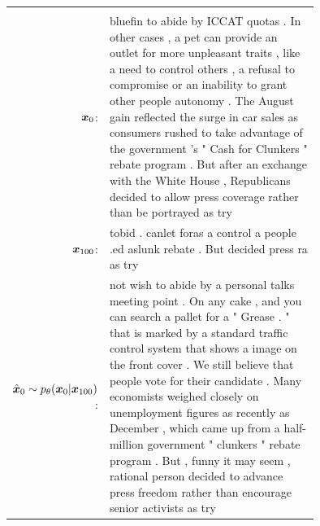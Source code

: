 {\begin{tabular}{rp{0.75\linewidth}}
\hline\\
$\boldsymbol{x}_0$: &\strut{}bluefin to abide by ICCAT quotas . In other cases , a pet can provide an outlet for more unpleasant traits , like a need to control others , a refusal to compromise or an inability to grant other people autonomy . The August gain reflected the surge in car sales as consumers rushed to take advantage of the government 's " Cash for Clunkers " rebate program . But after an exchange with the White House , Republicans decided to allow press coverage rather than be portrayed as try\\
$\boldsymbol{x}_{100}$: &\strut{}\smallmasktok{}\smallmasktok{} to\smallmasktok{}bid\smallmasktok{}\smallmasktok{}\smallmasktok{}\smallmasktok{}\smallmasktok{}\smallmasktok{}\smallmasktok{} .\smallmasktok{}\smallmasktok{}\smallmasktok{}\smallmasktok{}\smallmasktok{}\smallmasktok{}\smallmasktok{}\smallmasktok{} can\smallmasktok{}\smallmasktok{}\smallmasktok{}let for\smallmasktok{}\smallmasktok{}\smallmasktok{}\smallmasktok{}as\smallmasktok{}\smallmasktok{}\smallmasktok{}\smallmasktok{}\smallmasktok{}\smallmasktok{}\smallmasktok{}\smallmasktok{} a\smallmasktok{}\smallmasktok{} control\smallmasktok{}\smallmasktok{}\smallmasktok{} a\smallmasktok{}\smallmasktok{}\smallmasktok{}\smallmasktok{}\smallmasktok{}\smallmasktok{}\smallmasktok{}\smallmasktok{}\smallmasktok{}\smallmasktok{}\smallmasktok{} people\smallmasktok{}\smallmasktok{}\smallmasktok{}\smallmasktok{} .\smallmasktok{}\smallmasktok{}\smallmasktok{}\smallmasktok{}\smallmasktok{}ed\smallmasktok{}\smallmasktok{}\smallmasktok{}\smallmasktok{}\smallmasktok{} as\smallmasktok{}\smallmasktok{}\smallmasktok{}\smallmasktok{}\smallmasktok{}\smallmasktok{}\smallmasktok{}\smallmasktok{}\smallmasktok{}\smallmasktok{}\smallmasktok{}\smallmasktok{}\smallmasktok{}\smallmasktok{}\smallmasktok{}\smallmasktok{}\smallmasktok{}\smallmasktok{}lunk\smallmasktok{}\smallmasktok{}\smallmasktok{} rebate\smallmasktok{} .\smallmasktok{} But\smallmasktok{}\smallmasktok{}\smallmasktok{}\smallmasktok{}\smallmasktok{}\smallmasktok{}\smallmasktok{}\smallmasktok{}\smallmasktok{}\smallmasktok{}\smallmasktok{} decided\smallmasktok{}\smallmasktok{} press\smallmasktok{} ra\smallmasktok{}\smallmasktok{}\smallmasktok{}\smallmasktok{}\smallmasktok{} as try\\
$\hat{\boldsymbol{x}}_0 \sim p_\theta(\boldsymbol{x}_0 | \boldsymbol{x}_{100})$: &\strut{}not wish to abide by a personal talks meeting point . On any cake , and you can search a pallet for a " Grease . " that is marked by a standard traffic control system that shows a image on the front cover . We still believe that people vote for their candidate . Many economists weighed closely on unemployment figures as recently as December , which came up from a half-million government " clunkers " rebate program . But , funny it may seem , rational person decided to advance press freedom rather than encourage senior activists as try\\
\end{tabular}
}
